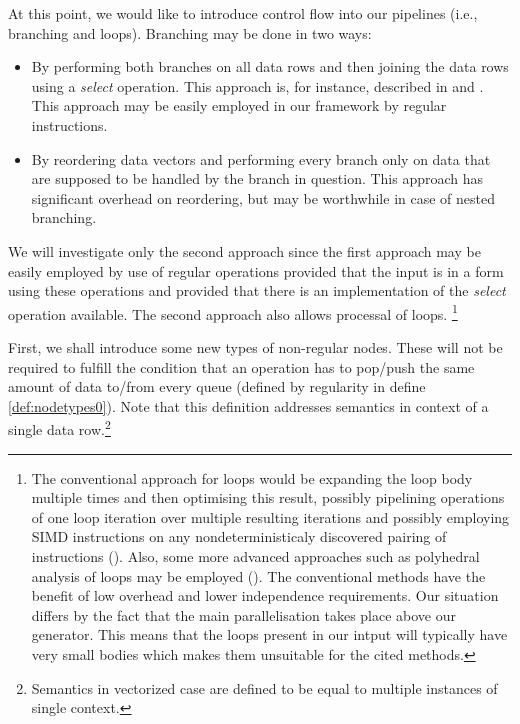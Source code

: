 \label{sec:analysis}

At this point, we would like to introduce control flow into our pipelines (i.e., branching and loops). Branching may be done in two ways:

\label{sec:branching}
\begin{itemize}
  \item By performing both branches on all data rows and then joining the data rows using a \emph{select} operation. This approach is, for instance, described in \cite{select} and \cite{select2}. This approach may be easily employed in our framework by regular instructions. 
  \item By reordering data vectors and performing every branch only on data that are supposed to be handled by the branch in question. This approach has significant overhead on reordering, but may be worthwhile in case of nested branching.
\end{itemize}

We will investigate only the second approach since the first approach may be easily employed by use of regular operations provided that the input is in a form using these operations and provided that there is an implementation of the \emph{select} operation available. The second approach also allows processal of loops. \footnote{The conventional approach for loops would be expanding the loop body multiple times and then optimising this result, possibly pipelining operations of one loop iteration over multiple resulting iterations and possibly employing SIMD instructions on any nondeterministicaly discovered pairing of instructions (\cite{compilers}). Also, some more advanced approaches such as polyhedral analysis of loops may be employed (\cite{polyhedra}). The conventional methods have the benefit of low overhead and lower independence requirements. Our situation differs by the fact that the main parallelisation takes place above our generator. This means that the loops present in our intput will typically have very small bodies which makes them unsuitable for the cited methods. }

\label{sec:node_types}

First, we shall introduce some new types of non-regular nodes. These will not be required to fulfill the condition that an operation has to pop/push the same amount of data to/from every queue (defined by regularity in define \ref{def:nodetypes0}). Note that this definition addresses semantics in context of a single data row.\footnote{Semantics in vectorized case are defined to be equal to multiple instances of single context.}

